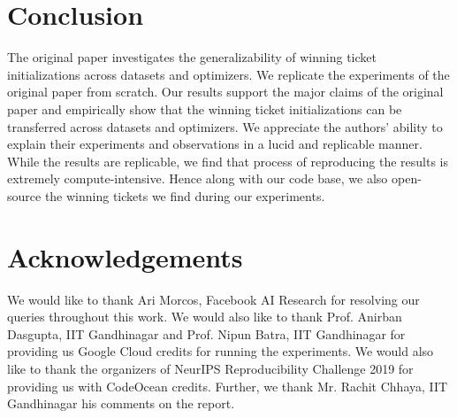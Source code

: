 \documentclass{article}
\begin{document}
\section{Conclusion}
The original paper \cite{repro_paper} investigates the generalizability of winning ticket initializations across datasets and optimizers. We replicate the experiments of the original paper from scratch. Our results support the major claims of the original paper and empirically show that the winning ticket initializations can be transferred across datasets and optimizers. We appreciate the authors' ability to explain their experiments and observations in a lucid and replicable manner. While the results are replicable, we find that process of reproducing the results is extremely compute-intensive. Hence along with our code base, we also open-source the winning tickets we find during our experiments.


\section{Acknowledgements}
We would like to thank Ari Morcos, Facebook AI Research for resolving our queries throughout this work. We would also like to thank Prof. Anirban Dasgupta, IIT Gandhinagar and Prof. Nipun Batra, IIT Gandhinagar for providing us Google Cloud credits for running the experiments. We would also like to thank the organizers of NeurIPS Reproducibility Challenge 2019 for providing us with CodeOcean credits. Further, we thank Mr. Rachit Chhaya, IIT Gandhinagar his comments on the report.











\end{document}
